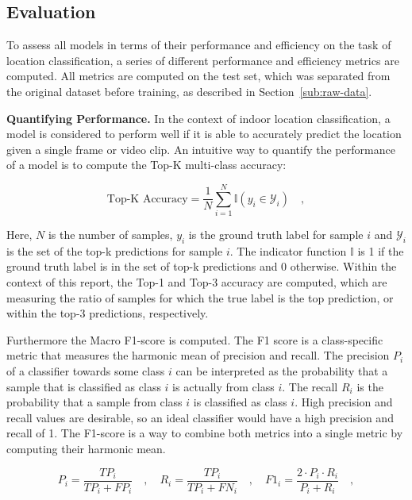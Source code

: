 \documentclass[a4paper]{article}
\begin{document}
\subsection{Evaluation} %
\label{sub:evaluation}

To assess all models in terms of their performance and efficiency on the task
of location classification, a series of different performance and efficiency
metrics are computed. All metrics are computed on the test set, which was
separated from the original dataset before training, as described in
Section~\ref{sub:raw-data}.

\textbf{Quantifying Performance.} In the context of indoor location
classification, a model is considered to perform well if it is able to
accurately predict the location given a single frame or video clip. An intuitive
way to quantify the performance of a model is to compute the Top-K multi-class
accuracy:

\begin{equation}
  \text{Top-K Accuracy} = \frac{1}{N} \sum_{i=1}^{N} \mathbb{I}(y_i \in
  \mathcal{Y}_i) \quad ,
  \label{eq:top-k-accuracy}
\end{equation}

Here, $N$ is the number of samples, $y_i$ is the ground truth label for sample
$i$ and $\mathcal{Y}_i$ is the set of the top-k predictions for sample $i$. The
indicator function $\mathbb{I}$ is 1 if the ground truth label is in the set of
top-k predictions and 0 otherwise. Within the context of this report, the Top-1
and Top-3 accuracy are computed, which are measuring the ratio of samples for
which the true label is the top prediction, or within the top-3 predictions,
respectively.

Furthermore the Macro F1-score is computed. The F1 score is a class-specific
metric that measures the harmonic mean of precision and recall. The precision
$P_i$ of a classifier towards some class $i$ can be interpreted as the
probability that a sample that is classified as class $i$ is actually from class
$i$. The recall $R_i$ is the probability that a sample from class $i$ is
classified as class $i$. High precision and recall values are desirable, so an
ideal classifier would have a high precision and recall of 1. The F1-score is a
way to combine both metrics into a single metric by computing their harmonic
mean.

\begin{equation}
  P_i = \frac{TP_i}{TP_i + FP_i} \quad , \quad R_i = \frac{TP_i}{TP_i + FN_i}
  \quad , \quad F1_i = \frac{2 \cdot P_i \cdot R_i}{P_i + R_i} \quad ,
  \label{eq:f1-score}
\end{equation}
\end{document}
